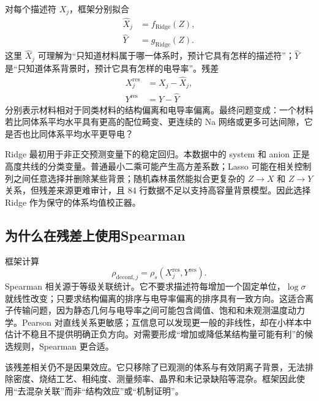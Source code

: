 对每个描述符 $X_j$，框架分别拟合
\begin{align}
\widehat{X}_j &= f_{\mathrm{Ridge}}(Z), \\
\widehat{Y} &= g_{\mathrm{Ridge}}(Z).
\end{align}
这里 $\widehat{X}_j$ 可理解为“只知道材料属于哪一体系时，预计它具有怎样的描述符”；$\widehat{Y}$ 是“只知道体系背景时，预计它具有怎样的电导率”。残差
\begin{align}
X_j^{\mathrm{res}} &= X_j-\widehat{X}_j,\\
Y^{\mathrm{res}} &= Y-\widehat{Y}
\end{align}
分别表示材料相对于同类材料的结构偏离和电导率偏离。最终问题变成：一个材料若比同体系平均水平具有更高的配位畸变、更连续的 Na 网络或更多可达间隙，它是否也比同体系平均水平更导电？

Ridge 最初用于非正交预测变量下的稳定回归\cite{Hoerl1970}。本数据中的 system 和 anion 正是高度共线的分类变量。普通最小二乘可能产生高方差系数；Lasso 可能在相关控制列之间任意选择并删除某些背景；随机森林虽然能拟合更复杂的 $Z\rightarrow X$ 和 $Z\rightarrow Y$ 关系，但残差来源更难审计，且 84 行数据不足以支持高容量背景模型。因此选择 Ridge 作为保守的体系均值校正器。

\subsection{为什么在残差上使用Spearman}

框架计算
\begin{equation}
\rho_{\mathrm{deconf},j}=\rho_s(X_j^{\mathrm{res}},Y^{\mathrm{res}}).
\end{equation}
Spearman 相关源于等级关联统计\cite{Spearman1904}。它不要求描述符每增加一个固定单位，$\log\sigma$ 就线性改变；只要求结构偏离的排序与电导率偏离的排序具有一致方向。这适合离子传输问题，因为静态几何与电导率之间可能包含阈值、饱和和未观测温度动力学。Pearson 对直线关系更敏感；互信息可以发现更一般的非线性，却在小样本中估计不稳且不提供明确正负方向。对需要形成“增加或降低某结构量可能有利”的候选规则，Spearman 更合适。

该残差相关仍不是因果效应。它只移除了已观测的体系与有效阴离子背景，无法排除密度、烧结工艺、相纯度、测量频率、晶界和未记录缺陷等混杂。框架因此使用“去混杂关联”而非“结构效应”或“机制证明”\cite{Pearl2009,Chernozhukov2018}。

